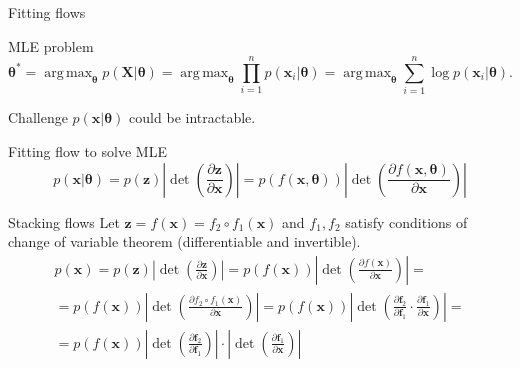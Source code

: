 \documentclass{beamer}
\newcommand{\bx}{\mathbf{x}}
\newcommand{\bz}{\mathbf{z}}
\newcommand{\bX}{\mathbf{X}}
\newcommand{\btheta}{\boldsymbol{\theta}}
\DeclareMathOperator*{\argmax}{arg\,max}
\begin{document}
\begin{frame}{Fitting flows}
	\begin{block}{MLE problem}
		\vspace{-0.3cm}
		\[
		\btheta^* = \argmax_{\btheta} p(\bX | \btheta) = \argmax_{\btheta} \prod_{i=1}^n p(\bx_i | \btheta) = \argmax_{\btheta} \sum_{i=1}^n \log p(\bx_i | \btheta).
		\]
		\vspace{-0.3cm}
	\end{block}
	\begin{block}{Challenge}
		$p(\bx | \btheta)$ could be intractable.
	\end{block}
	\begin{block}{Fitting flow to solve MLE}
		\[
		p(\bx|\btheta) = p(\bz) \left|\det \left(  \frac{\partial \bz}{\partial \bx} \right) \right|  = p(f(\bx, \btheta)) \left|\det \left( \frac{\partial f(\bx, \btheta)}{\partial \bx} \right) \right|
		\]
	\end{block}
\end{frame}
\begin{frame}{Stacking flows}
	Let $\bz = f(\bx) = f_2 \circ f_1(\bx)$ and $f_1, f_2$ satisfy conditions of change of variable theorem (differentiable and invertible).
	\begin{multline*}
		p(\bx) = p(\bz) \left|\det \left(  \frac{\partial \bz}{\partial \bx} \right) \right| = p(f(\bx)) \left|\det \left(  \frac{\partial f(\bx)}{\partial \bx} \right) \right| = \\
		= p(f(\bx)) \left|\det \left(\frac{\partial f_2 \circ f_1(\bx)}{\partial \bx} \right) \right| =
		p(f(\bx)) \left|\det \left(\frac{\partial \textbf{f}_2}{\partial \textbf{f}_1} \cdot \frac{\partial \textbf{f}_1}{\partial \bx} \right) \right| = \\
		= p(f(\bx))  \left|\det \left(\frac{\partial \textbf{f}_2}{\partial \textbf{f}_1} \right) \right| \cdot \left| \det \left( \frac{\partial \textbf{f}_1}{\partial \bx} \right) \right|
	\end{multline*}
\end{frame}
\end{document}
